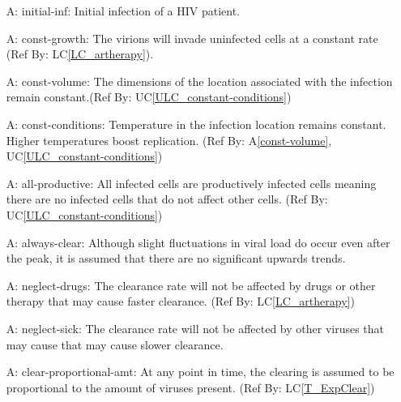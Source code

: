 \documentclass[12pt]{article}
\newcounter{assumpnum} %
\newcommand{\aref}[1]{A\ref{#1}}
\newcommand{\lcref}[1]{LC\ref{#1}}
\newcommand{\ucref}[1]{UC\ref{#1}}
\begin{document}
\begin{itemize}

\item[A\refstepcounter{assumpnum}\theassumpnum \label{initial-inf}:]
initial-inf: Initial infection of a HIV patient.

\item[A\refstepcounter{assumpnum}\theassumpnum \label{const-growth}:]
const-growth: The virions will invade uninfected cells at a constant 
rate (Ref By: \lcref{LC_artherapy}).
  
\item[A\refstepcounter{assumpnum}\theassumpnum \label{const-volume}:]
const-volume: The dimensions of the location associated with the 
infection remain constant.(Ref By: \ucref{ULC_constant-conditions})
  
\item[A\refstepcounter{assumpnum}\theassumpnum \label{const-conditions}:]
const-conditions: Temperature in the infection location remains constant. 
Higher temperatures boost replication. (Ref By: \aref{const-volume}, 
\ucref{ULC_constant-conditions})\citep{10.1371/journal.ppat.1002792}

\item[A\refstepcounter{assumpnum}\theassumpnum \label{all-productive}:]
all-productive: All infected cells are productively infected cells 
meaning there are no infected cells that do not affect other cells. (Ref By: 
\ucref{ULC_constant-conditions})
  
\item[A\refstepcounter{assumpnum}\theassumpnum \label{always-clear}:]
always-clear: Although slight fluctuations in viral load do occur even 
after the peak, it is assumed that there are no significant upwards trends.
   
\item[A\refstepcounter{assumpnum}\theassumpnum \label{neglect-drugs}:]
neglect-drugs: The clearance rate will not be affected by drugs or other 
therapy that may cause faster clearance. (Ref By: \lcref{LC_artherapy})
  
\item[A\refstepcounter{assumpnum}\theassumpnum \label{neglect-sick}:]
neglect-sick: The clearance rate will not be affected by other viruses 
that may cause that may cause slower clearance.

\item[A\refstepcounter{assumpnum}\theassumpnum \label{clear-proportional-amt}:]
clear-proportional-amt: At any point in time, the clearing is assumed to be 
proportional to the amount of viruses present. (Ref By: \lcref{T_ExpClear})

\end{itemize}
\end{document}
